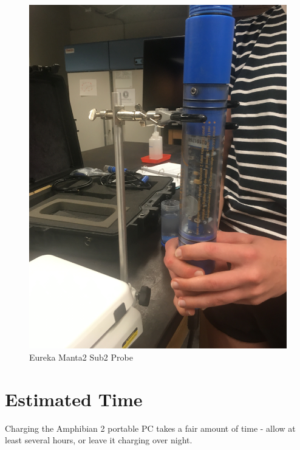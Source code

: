 \documentclass[12pt]{../SOP3}\usepackage[]{graphicx}\usepackage[]{color}
\begin{document}
\begin{figure}
\includegraphics[width=\textwidth]{Images/Entire_manta.JPG}
\caption{Eureka Manta2 Sub2 Probe}
\label{Entire_manta.JPG}
\end{figure}





\section{Estimated Time}

\NP Charging the Amphibian 2 portable PC takes a fair amount of time - allow at least several hours, or leave it charging over night. 
\end{document}
